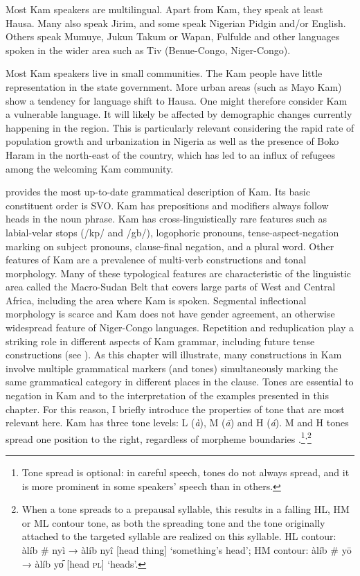 \documentclass[output=paper,colorlinks,citecolor=brown]{langscibook}
\begin{document}
Most Kam speakers are multilingual. Apart from Kam, they speak at least Hausa. Many also speak Jirim, and some speak Nigerian Pidgin and/or English. Others speak Mumuye, Jukun Takum or Wapan, Fulfulde and other languages spoken in the wider area such as Tiv (Benue-Congo, Niger-Congo). 

Most Kam speakers live in small communities. The Kam people have little representation in the state government. More urban areas (such as Mayo Kam) show a tendency for language shift to Hausa. One might therefore consider Kam a vulnerable language. It will likely be affected by demographic changes currently happening in the region. This is particularly relevant considering the rapid rate of population growth and urbanization in Nigeria as well as the presence of Boko Haram in the north-east of the country, which has led to an influx of refugees among the welcoming Kam community.

\citet{Lesage2020} provides the most up-to-date grammatical description of Kam. Its basic constituent order is SVO. Kam has prepositions and modifiers always follow heads in the noun phrase. Kam has cross-linguistically rare features such as labial-velar stops (/kp/ and /gb/), logophoric pronouns, tense-aspect-negation marking on subject pronouns, clause-final negation, and a plural word. Other features of Kam are a prevalence of multi-verb constructions and tonal morphology. Many of these typological features are characteristic of the linguistic area called the Macro-Sudan Belt \citep{Güldemann2008,Güldemann2018} that covers large parts of West and Central Africa, including the area where Kam is spoken. Segmental inflectional morphology is scarce and Kam does not have gender agreement, an otherwise widespread feature of Niger-Congo languages. Repetition and reduplication play a striking role in different aspects of Kam grammar, including future tense constructions (see ). As this chapter will illustrate, many constructions in Kam involve multiple grammatical markers (and tones) simultaneously marking the same grammatical category in different places in the clause. Tones are essential to negation in Kam and to the interpretation of the examples presented in this chapter. For this reason, I briefly introduce the properties of tone that are most relevant here. Kam has three tone levels: L (\textit{à}), M (\textit{ā}) and H (\textit{á}). M and H tones spread one position to the right, regardless of morpheme boundaries .\footnote{Tone spread is optional: in careful speech, tones do not always spread, and it is more prominent in some speakers’ speech than in others.}\textsuperscript{,}\footnote{When a tone spreads to a prepausal syllable, this results in a falling HL, HM or ML contour tone, as both the spreading tone and the tone originally attached to the targeted syllable are realized on this syllable. HL contour: àlíb \# nyì → àlíb nyî [head thing] ‘something’s head’; HM contour: àlíb \# yō → àlíb yo᷇  [head \textsc{pl}] ‘heads’.}
\end{document}
